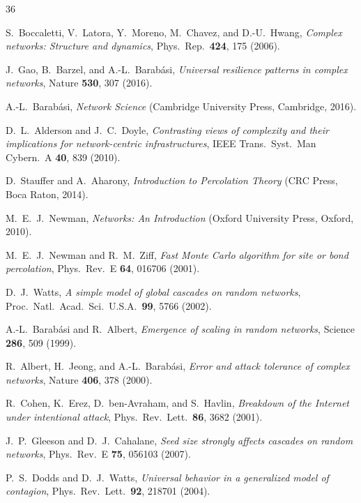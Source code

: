 \documentclass[aps,pre,twocolumn,superscriptaddress,showpacs]{revtex4-2}
\begin{document}
\begin{thebibliography}{36}

S.~Boccaletti, V.~Latora, Y.~Moreno, M.~Chavez, and D.-U.~Hwang,
\emph{Complex networks: Structure and dynamics},
Phys.\ Rep.\ \textbf{424}, 175 (2006).

J.~Gao, B.~Barzel, and A.-L.~Barab\'asi,
\emph{Universal resilience patterns in complex networks},
Nature \textbf{530}, 307 (2016).

A.-L.~Barab\'asi,
\emph{Network Science} (Cambridge University Press, Cambridge, 2016).

D.~L.~Alderson and J.~C.~Doyle,
\emph{Contrasting views of complexity and their implications for network-centric infrastructures},
IEEE Trans.\ Syst.\ Man Cybern.\ A \textbf{40}, 839 (2010).

D.~Stauffer and A.~Aharony,
\emph{Introduction to Percolation Theory} (CRC Press, Boca Raton, 2014).

M.~E.~J.~Newman,
\emph{Networks: An Introduction} (Oxford University Press, Oxford, 2010).

M.~E.~J.~Newman and R.~M.~Ziff,
\emph{Fast Monte Carlo algorithm for site or bond percolation},
Phys.\ Rev.\ E \textbf{64}, 016706 (2001).

D.~J.~Watts,
\emph{A simple model of global cascades on random networks},
Proc.\ Natl.\ Acad.\ Sci.\ U.S.A.\ \textbf{99}, 5766 (2002).

A.-L.~Barab\'asi and R.~Albert,
\emph{Emergence of scaling in random networks},
Science \textbf{286}, 509 (1999).

R.~Albert, H.~Jeong, and A.-L.~Barab\'asi,
\emph{Error and attack tolerance of complex networks},
Nature \textbf{406}, 378 (2000).

R.~Cohen, K.~Erez, D.~ben-Avraham, and S.~Havlin,
\emph{Breakdown of the Internet under intentional attack},
Phys.\ Rev.\ Lett.\ \textbf{86}, 3682 (2001).

J.~P.~Gleeson and D.~J.~Cahalane,
\emph{Seed size strongly affects cascades on random networks},
Phys.\ Rev.\ E \textbf{75}, 056103 (2007).

P.~S.~Dodds and D.~J.~Watts,
\emph{Universal behavior in a generalized model of contagion},
Phys.\ Rev.\ Lett.\ \textbf{92}, 218701 (2004).


\end{thebibliography}
\end{document}
